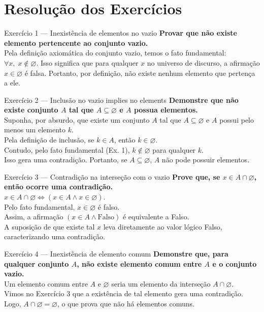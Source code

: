 \documentclass[12pt]{article}
\begin{document}
\vspace*{0.2cm}

\section*{Resolução dos Exercícios}

\begin{block}{Exercício 1 — Inexistência de elementos no vazio}
\textbf{Provar que não existe elemento pertencente ao conjunto vazio.} \\
Pela definição axiomática do conjunto vazio, temos o fato fundamental: $\forall x, \; x \notin \varnothing$. Isso significa que para qualquer $x$ no universo de discurso, a afirmação $x \in \varnothing$ é falsa. Portanto, por definição, não existe nenhum elemento que pertença a ele.
\end{block}

\begin{block}{Exercício 2 — Inclusão no vazio implies no elements}
\textbf{Demonstre que não existe conjunto $A$ tal que $A \subseteq \varnothing$ e $A$ possua elementos.} \\
Suponha, por absurdo, que existe um conjunto $A$ tal que $A \subseteq \varnothing$ e $A$ possui pelo menos um elemento $k$. \\
Pela definição de inclusão, se $k \in A$, então $k \in \varnothing$. \\
Contudo, pelo fato fundamental (Ex. 1), $k \notin \varnothing$ para qualquer $k$. \\
Isso gera uma contradição. Portanto, se $A \subseteq \varnothing$, $A$ não pode possuir elementos.
\end{block}

\begin{block}{Exercício 3 — Contradição na interseção com o vazio}
\textbf{Prove que, se $x \in A \cap \varnothing$, então ocorre uma contradição.} \\
$x \in A \cap \varnothing \iff (x \in A \land x \in \varnothing)$. \\
Pelo fato fundamental, $x \in \varnothing$ é falso. \\
Assim, a afirmação $(x \in A \land \text{Falso})$ é equivalente a Falso. \\
A suposição de que existe tal $x$ leva diretamente ao valor lógico Falso, caracterizando uma contradição.
\end{block}

\begin{block}{Exercício 4 — Inexistência de elemento comum}
\textbf{Demonstre que, para qualquer conjunto $A$, não existe elemento comum entre $A$ e o conjunto vazio.} \\
Um elemento comum entre $A$ e $\varnothing$ seria um elemento da interseção $A \cap \varnothing$. \\
Vimos no Exercício 3 que a existência de tal elemento gera uma contradição. Logo, $A \cap \varnothing = \varnothing$, o que prova que não há elementos comuns.
\end{block}
\end{document}
